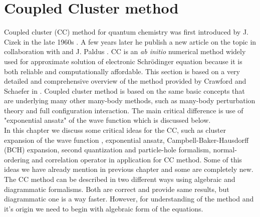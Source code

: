 \documentclass[twoside,english]{uiofysmaster}
\theoremstyle{definition}
\begin{document}
\chapter{Coupled Cluster method} \label{ch:coupled_cluster}
Coupled cluster (CC) method for quantum chemistry was first introduced by J. Cizek in the late 1960s \cite{cizekCorrelationProblemsAtomic}. A few years later he publish a new article on the topic in collaboration with and J. Paldus \cite{cizekCorrelationProblemAtomic1966}. CC is an \textit{ab initio} numerical method widely used for approximate solution of electronic Schr\"{o}dinger equation because it is both reliable and computationally affordable. This section is based on a very detailed and comprehensive overview of the method provided by Crawford and Schaefer in \cite{crawfordIntroductionCoupledCluster2007}. Coupled cluster method is based on the same basic concepts that are underlying many other many-body methods, such as many-body perturbation theory and full configuration interaction. The main critical difference is use of "exponential ansatz" of the wave function which is discussed below.\\
In this chapter we discuss some critical ideas for the CC, such as cluster expansion of the wave function , exponential ansatz, Campbell-Baker-Hausdorff (BCH) expansion, second quantization and particle-hole formalism, normal-ordering and correlation operator in application for CC method. Some of this ideas we have already mention in previous chapter and some are completely new. The CC method can be described in two different ways using algebraic and diagrammatic formalisms. Both are correct and provide same results, but diagrammatic one is a way faster. However, for understanding of the method and it's origin we need to begin with algebraic form of the equations.\\
\end{document}
